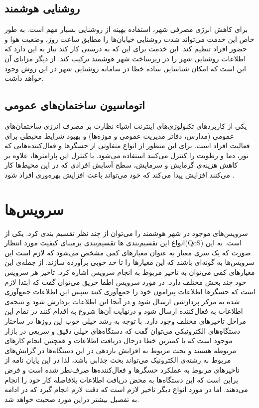     \subsection{روشنایی هوشمند}
      برای کاهش انرژی مصرفی شهر، استفاده بهینه از روشنایی بسیار مهم است.
      به طور خاص این خدمت می‌تواند شدت روشنایی خیابان‌ها را مطابق ساعت روز، وضعیت هوا و حضور افراد تنظیم کند.
      این خدمت برای این که به درستی کار کند نیاز به این دارد که اطلاعات روشنایی شهر را در زیرساخت شهر هوشمند ترکیب کند.
      از دیگر مزایای آن این است که امکان شناسایی ساده خطا در سامانه روشنایی شهر در این روش وجود خواهد داشت.

    \subsection{اتوماسیون ساختمان‌های عمومی}
      یکی از کاربرد‌های تکنولوژی‌های اینترنت اشیاء نظارت بر مصرف انرژی ساختمان‌های عمومی (مدارس، دفاتر مدیریت عمومی و موزه‌ها) و بهبود شرایط محیطی برای فعالیت افراد است.
      برای این منظور از انواع متفاوتی از حسگر‌ها و فعال‌کننده‌هایی که نور، دما و رطوبت را کنترل می‌کنند استفاده می‌شود.
      با کنترل این پارامتر‌ها، علاوه بر کاهش هزینه‌ی گرمایش و سرمایش، سطح آسایش افرادی که در این محیط‌ها کار می‌کنند افزایش پیدا می‌کند که خود می‌تواند باعث افزایش بهره‌وری افراد شود \cite{lee2008intelligent}.

  \section{سرویس‌ها}
    سرویس‌های موجود در شهر هوشمند را می‌توان از چند نظر تقسیم بندی کرد. یکی از انواع این تقسیم‌بندی ها تقسیم‌بندی برمبنای کیفیت مورد انتظار(QoS) است. به این صورت که یک سری معیار به عنوان معیارهای کمی مشخص می‌شود که لازم است این سرویس‌ها به گونه‌ای باشند که این معیارها را تا حد خوبی برآورده سازند. از جمله‌ی این معیارهای کمی می‌توان به تاخیر مربوط به انجام سرویس اشاره کرد. 
    تاخیر هر سرویس خود چند بخش مختلف دارد. در مورد سرویس اطفا حریق می‌توان گفت که ابتدا لازم است که حسگرها اطلاعات پیرامون خود را جمع‌آوری کنند سپس این اطلاعات جمع‌آوری شده به مرکز پردازشی ارسال شود و در آنجا این اطلاعات پردازش شود و نتیجه‌ی اطلاعات به فعال‌کننده ارسال شود و درنهایت آن‌ها شروع به اقدام کنند در تمام این مراحل تاخیرهای مختلف وجود دارد.
    با توجه به رشد خیلی خوب این روزها در ساختار دستگاهِِ‌های الکترونیکی می‌توان گفت که دستگاه‌های خیلی دقیق و سریعی در بازار موجود است که با کمترین خطا درحال دریافت اطلاعات و همچنین انجام کارهای مربوطه هستند و بحث مربوط به افزایش بازدهی در این دستگاه‌ها در گرایش‌های مربوط به رشته‌ی الکترونیک می‌تواند بحث جذابی باشد، لذا در این پایان نامه از تاخیرهای مربوط به عملکرد حسگرها و فعال‌کننده‌ها صرف‌‌نظر شده است و فرض براین است که این دستگاه‌ها به محض دریافت اطلاعات بلافاصله کار خود را انجام می‌دهند. اما در مورد انواع دیگر تاخیر لازم است که دقت لازم انجام گیرد که در ادامه به تفصیل بیشتر دراین مورد صحبت خواهد شد.
    
